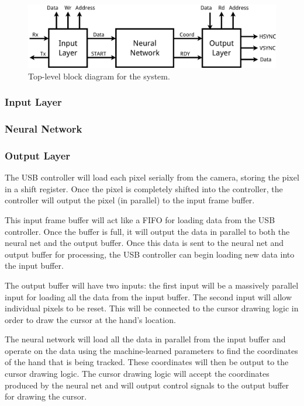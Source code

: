 \documentclass[10pt]{article}
\begin{document}
\begin{figure}[h]
    \centering
    \includegraphics[width=0.8\linewidth]{diagrams/top-level.png}
    \caption{Top-level block diagram for the system.}
\label{fig:top-level}
\end{figure}

\subsubsection{Input Layer}
\label{ssub:input_layer}

\subsubsection{Neural Network}
\label{ssub:neural_network}

\subsubsection{Output Layer}
\label{ssub:output_layer}

The USB controller will load each pixel serially from the camera, storing the
pixel in a shift register. Once the pixel is completely shifted into the
controller, the controller will output the pixel (in parallel) to the input
frame buffer.

This input frame buffer will act like a FIFO for loading data from the USB
controller. Once the buffer is full, it will output the data in parallel
to both the neural net and the output buffer. Once this data is sent to the
neural net and output buffer for processing, the USB controller can begin
loading new data into the input buffer.

The output buffer will have two inputs: the first input will be a massively
parallel input for loading all the data from the input buffer. The second input
will allow individual pixels to be reset. This will be connected to the cursor
drawing logic in order to draw the cursor at the hand's location.

The neural network will load all the data in parallel from the input buffer and
operate on the data using the machine-learned parameters to find the coordinates
of the hand that is being tracked. These coordinates will then be output to the
cursor drawing logic. The cursor drawing logic will accept the coordinates
produced by the neural net and will output control signals to the output buffer
for drawing the cursor.
\end{document}
